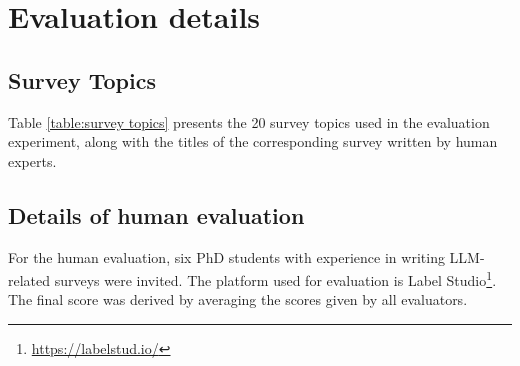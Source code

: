 \section{Evaluation details}
\label{sec:Evaluation details}

\subsection{Survey Topics}
\label{subsec:Survey Topics}

Table \ref{table:survey topics} presents the 20 survey topics used in the evaluation experiment, along with the titles of the corresponding survey written by human experts.


\subsection{Details of human evaluation}
\label{subsec:Details of human evaluation}
For the human evaluation, six PhD students with experience in writing LLM-related surveys were invited. The platform used for evaluation is Label Studio\footnote{\url{https://labelstud.io/}}. The final score was derived by averaging the scores given by all evaluators.
